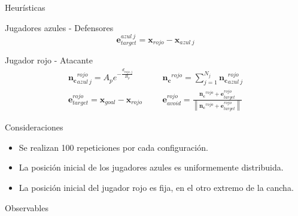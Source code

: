 \begin{frame}{Heurísticas}
    \begin{block}{Jugadores azules - Defensores}
        \small{}
        \begin{equation*}
            \mathbf{e}_{target}^{azul\ j} = \mathbf{x}_{rojo} - \mathbf{x}_{azul\ j}
        \end{equation*}
    \end{block}
    \begin{block}{Jugador rojo - Atacante}
        \small{
        }
        \begin{equation*}
            \begin{aligned}
                \mathbf{n_c}_{azul\ j}^{rojo} = A_p e^{-\frac{d_{rojo,j}}{B_p}} &&& \mathbf{n_c}^{rojo} = \sum_{j=1}^{N_j} \mathbf{n_c}_{azul\ j}^{rojo} \\
                \mathbf{e}_{target}^{rojo} = \mathbf{x}_{goal} - \mathbf{x}_{rojo} &&& \mathbf{e}_{avoid}^{rojo} = \frac{\mathbf{n_c}^{rojo} + \mathbf{e}_{target}^{rojo}}{\left\| \mathbf{n_c}^{rojo} + \mathbf{e}_{target}^{rojo} \right\|}
            \end{aligned}
        \end{equation*}
    \end{block}
\end{frame}

\begin{frame}{Consideraciones}
    \begin{itemize}
        \item Se realizan 100 repeticiones por cada configuración.
        \item La posición inicial de los jugadores azules es uniformemente distribuida.
        \item La posición inicial del jugador rojo es fija, en el otro extremo de la cancha.
    \end{itemize}
\end{frame}

\begin{frame}{Observables}

\end{frame}